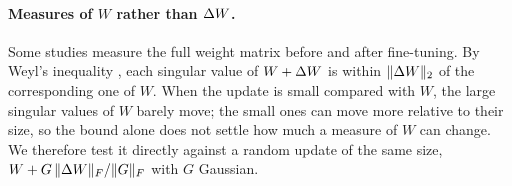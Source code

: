 \paragraph{Measures of $W$ rather than $\Delta W$.} Some studies measure the full
weight matrix before and after fine-tuning. By Weyl's inequality
\citep{horn2012matrix}, each singular value of $W + \Delta W$ is within
$\|\Delta W\|_2$ of the corresponding one of $W$. When the update is small
compared with $W$, the large singular values of $W$ barely move; the small
ones can move more relative to their size, so the bound alone does not settle
how much a measure of $W$ can change. We therefore test it directly against a
random update of the same size, $W + G\,\|\Delta W\|_F/\|G\|_F$ with $G$
Gaussian.
